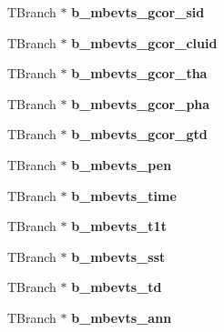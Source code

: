 \begin{DoxyCompactItemize}
\item 
\hypertarget{classg__clx_ade7b131c7bdc5550ee4f7564a562ebbf}{T\-Branch $\ast$ {\bfseries b\-\_\-mbevts\-\_\-gcor\-\_\-sid}}\label{classg__clx_ade7b131c7bdc5550ee4f7564a562ebbf}

\item 
\hypertarget{classg__clx_ae23d5724733086d7e63dc3f69a5785ae}{T\-Branch $\ast$ {\bfseries b\-\_\-mbevts\-\_\-gcor\-\_\-cluid}}\label{classg__clx_ae23d5724733086d7e63dc3f69a5785ae}

\item 
\hypertarget{classg__clx_a014cf5b11b0198747192d29bbf506066}{T\-Branch $\ast$ {\bfseries b\-\_\-mbevts\-\_\-gcor\-\_\-tha}}\label{classg__clx_a014cf5b11b0198747192d29bbf506066}

\item 
\hypertarget{classg__clx_aba6a6fa2f721ae370bac54aae22c793e}{T\-Branch $\ast$ {\bfseries b\-\_\-mbevts\-\_\-gcor\-\_\-pha}}\label{classg__clx_aba6a6fa2f721ae370bac54aae22c793e}

\item 
\hypertarget{classg__clx_af3eb18cba48802757fe342cd7f04d15b}{T\-Branch $\ast$ {\bfseries b\-\_\-mbevts\-\_\-gcor\-\_\-gtd}}\label{classg__clx_af3eb18cba48802757fe342cd7f04d15b}

\item 
\hypertarget{classg__clx_a798da42e3e08624f65e7a62e72768731}{T\-Branch $\ast$ {\bfseries b\-\_\-mbevts\-\_\-pen}}\label{classg__clx_a798da42e3e08624f65e7a62e72768731}

\item 
\hypertarget{classg__clx_a4d33de820956789eb93800fdc7ac810d}{T\-Branch $\ast$ {\bfseries b\-\_\-mbevts\-\_\-time}}\label{classg__clx_a4d33de820956789eb93800fdc7ac810d}

\item 
\hypertarget{classg__clx_a9fd1202c0a19cbfa3787500451e4ebf2}{T\-Branch $\ast$ {\bfseries b\-\_\-mbevts\-\_\-t1t}}\label{classg__clx_a9fd1202c0a19cbfa3787500451e4ebf2}

\item 
\hypertarget{classg__clx_a336653d8862dabf46279816252cd9a67}{T\-Branch $\ast$ {\bfseries b\-\_\-mbevts\-\_\-sst}}\label{classg__clx_a336653d8862dabf46279816252cd9a67}

\item 
\hypertarget{classg__clx_a11241953b3c0bfb60e12b5e958c33000}{T\-Branch $\ast$ {\bfseries b\-\_\-mbevts\-\_\-td}}\label{classg__clx_a11241953b3c0bfb60e12b5e958c33000}

\item 
\hypertarget{classg__clx_a68936e16782c4be67cd3c4ce8eae7132}{T\-Branch $\ast$ {\bfseries b\-\_\-mbevts\-\_\-ann}}\label{classg__clx_a68936e16782c4be67cd3c4ce8eae7132}


\end{DoxyCompactItemize}
